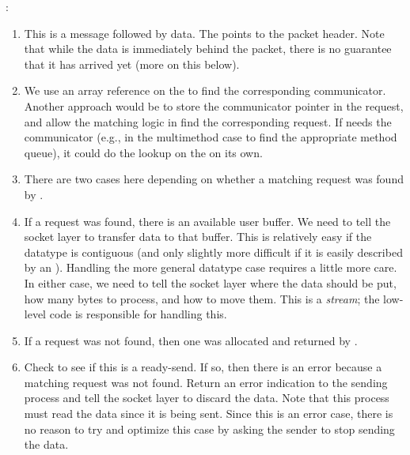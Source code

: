 :
\begin{enumerate}
\item This is a message followed by data.  The  points to the
  packet header.  Note that while the data is immediately behind the packet,
  there is no guarantee that it has arrived yet (more on this below).

\item We use an array reference on the  to find the
  corresponding communicator.  Another approach would be to store the
  communicator pointer in the request, and allow the matching logic in
   find the corresponding request.  
  If  needs the communicator (e.g., in the
  multimethod case to find the appropriate method queue), it could do the
  lookup on the  on its own.

\item There are two cases here depending on whether a matching request was
  found by .  

\item If a request was found, there is an available user buffer.  We need to
  tell the socket layer to transfer data to that buffer.  This is relatively
  easy if the datatype is contiguous (and only slightly more difficult if it
  is easily described by an ).  Handling the more general datatype
  case requires a little more care.  In either case, we need to tell the
  socket layer where the data should be put, how many bytes to process, and
  how to move them.  This is a \emph{stream}; the low-level code is
  responsible for handling this.


\item If a request was not found, then one was allocated and returned by
  .  

\item Check to see if this is a ready-send.  If so, then there is an error
  because a matching request was not found.  Return an error indication to the
  sending process and tell the socket layer to discard the data.
  Note that this process must read the data since it is being sent.  Since
  this is an error case, there is no reason to try and optimize this case by
  asking the sender to stop sending the data.


\end{enumerate}
